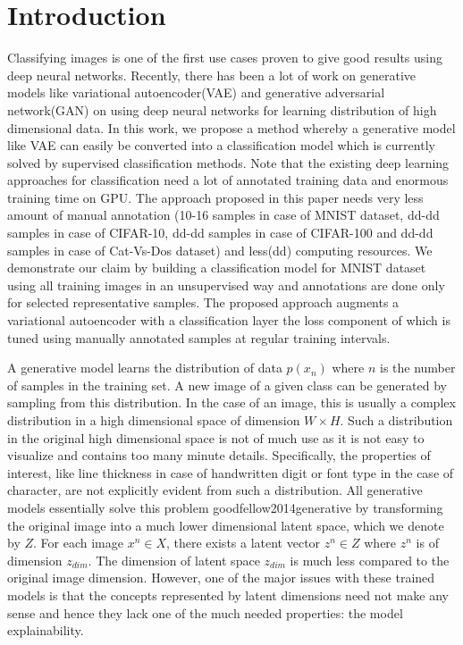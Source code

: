 \documentclass{uai2021} %
\begin{document}
\section{Introduction}\label{sec:intro}
Classifying images is one of the first use cases proven to give good results using deep neural networks. Recently, there has been a lot of work on generative models like variational autoencoder(VAE)\cite{kingma2013auto} and generative adversarial network(GAN) \cite{goodfellow2014generative} on using deep neural networks for learning distribution of high dimensional data. In this work, we propose a method whereby a generative model like VAE can easily be converted into a classification model which is currently solved by supervised classification methods. Note that the existing deep learning approaches for classification  need a lot of annotated training data and enormous training time on GPU\cite{krizhevsky2012imagenet}\cite{simonyan2014very}\cite{he2016deep}. The approach proposed in this paper needs very less amount of manual annotation (10-16 samples in case of MNIST dataset,  dd-dd samples in case of CIFAR-10, dd-dd samples in case of CIFAR-100 and  dd-dd samples in case of Cat-Vs-Dos dataset)  and less(dd) computing resources. We demonstrate our claim by building a classification model for MNIST dataset using all training images in an unsupervised way and annotations are done only for selected representative samples. The proposed approach augments a  variational autoencoder with a classification layer the loss component of which is tuned using manually annotated samples at regular training intervals.


A generative model learns the distribution of data $p(x_{n})$ where $n$ is the number of samples in the training set. A new image of a given class can be generated by sampling from this distribution. In the case of an image, this is usually a complex distribution in a high dimensional space of dimension $W \times H$. Such a distribution in the original high dimensional space is not of much use as it is not easy to visualize and contains too many  minute details.
Specifically, the properties of interest, like line thickness in case of handwritten digit or font type in the case of character, are not explicitly evident from such a distribution.
All generative models essentially solve this problem \cite{kingma2013auto}{goodfellow2014generative} by transforming the original image into a much lower dimensional latent space, which we denote by $Z$. For each image $x^n \in X$, there exists a latent vector  $z^n \in Z$  where $z^n$ is of dimension $z_{dim}$. The dimension of latent space $z_{dim}$ is much less compared to the original image dimension. However, one of the major issues with these trained models is that the concepts represented by latent dimensions need not make any sense and hence they lack one of the much needed properties: the model explainability.
\end{document}
